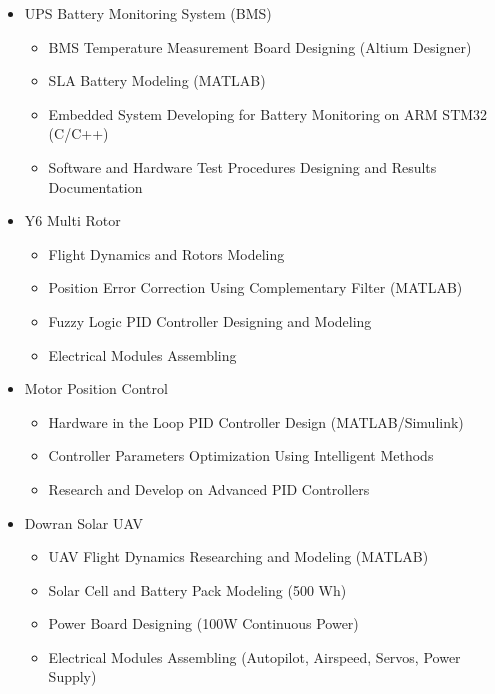 \documentclass[10pt,a4paper,sans]{moderncv} %
\begin{document}
\begin{itemize}[nosep]
		\vspace{0.5em}
		
		\item UPS Battery Monitoring System (BMS) %
		\begin{itemize}[nosep]
		    \item BMS Temperature Measurement Board Designing (Altium Designer)
		    \item SLA Battery Modeling (MATLAB)
		    \item Embedded System Developing for Battery Monitoring on ARM STM32 (C/C++)
		    \item Software and Hardware Test Procedures Designing and Results Documentation
		\end{itemize}
        
        \vspace{0.5em}

		\item Y6 Multi Rotor %
		\begin{itemize}[nosep]
		    \item Flight Dynamics and Rotors Modeling
		    \item Position Error Correction Using Complementary Filter (MATLAB)
		    \item Fuzzy Logic PID Controller Designing and Modeling
		    \item Electrical Modules Assembling
		\end{itemize}
		
		\vspace{0.5em}
		
		\item Motor Position Control %
		\begin{itemize}[nosep]
		    \item Hardware in the Loop PID Controller Design (MATLAB/Simulink)
		    \item Controller Parameters Optimization Using Intelligent Methods
		    \item Research and Develop on Advanced PID Controllers
		\end{itemize}

        \vspace{0.5em}

		\item Dowran Solar UAV %
		\begin{itemize}[nosep]
		    \item UAV Flight Dynamics Researching and Modeling (MATLAB)
		    \item Solar Cell and Battery Pack Modeling (500 Wh)
		    \item Power Board Designing (100W Continuous Power)
		    \item Electrical Modules Assembling (Autopilot, Airspeed, Servos, Power Supply)
		\end{itemize}
	
	\end{itemize}
	
\end{document}
